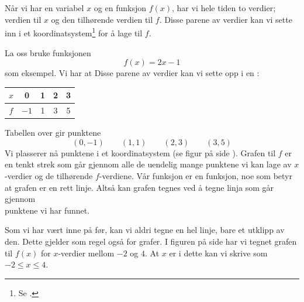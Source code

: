 \newpage
{}
\section{\lingraf}
Når vi har en variabel $ x $ og en funksjon $ f(x) $, har vi hele tiden to verdier; verdien til $ x $ og den tilhørende verdien til $ f $. Disse parene av verdier kan vi sette inn i et koordinatsystem\footnote{Se .} for å lage  til $ f $. \vsk

La oss bruke funksjonen 
\[ f(x)=2x-1 \]
som eksempel. Vi har at
Disse parene av verdier kan vi sette opp i en :
	\begin{center}
	\begin{tabular}{c | c |c |c|c}
		$ x $ & 0 & 1 & 2 & 3 \\ \hline
		$ f $ &$  -1 $ & 1&3 &5
	\end{tabular}
\end{center}
Tabellen over gir punktene
\[ (0, -1)\quad\quad(1, 1)\quad\quad(2, 3)\quad\quad(3, 5) \]
Vi plasserer nå punktene i et koordinatsystem (se figur på side \pageref{funkfig}). Grafen til $ f $ er en tenkt strek som går gjennom alle de uendelig mange punktene vi kan lage av $ x$-verdier og de tilhørende $ f$-verdiene. Vår funksjon er en  funksjon, noe som betyr at grafen er en rett linje. Altså kan grafen tegnes ved å tegne linja som går gjennom\\ punktene vi har funnet.\vsk

Som vi har vært inne på før, kan vi aldri tegne en hel linje, bare et utklipp av den. Dette gjelder som regel også for grafer. I figuren på side \pageref{funkfig} har vi tegnet grafen til $ f(x) $ for $ x $-verdier mellom $ -2 $ og $ 4 $. At $ x $ er i dette  kan vi skrive som $ -2\leq x\leq 4 $.
 \label{funkfig}


